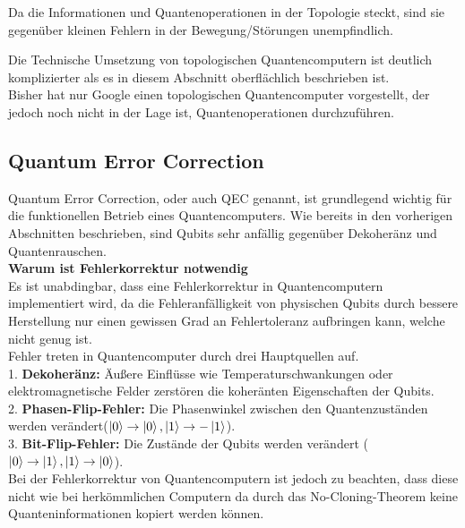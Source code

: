 Da die Informationen und Quantenoperationen in der Topologie steckt, sind sie gegenüber kleinen Fehlern in der Bewegung/Störungen unempfindlich.\\

\begin{tcolorbox}[title=Kommentar,
    title filled=false,
    colback=cyan!5!white,
    colframe=cyan!75!black]
    Die Technische Umsetzung von topologischen Quantencomputern ist deutlich komplizierter als es in diesem Abschnitt oberflächlich beschrieben ist.\\
    Bisher hat nur Google einen topologischen Quantencomputer vorgestellt, der jedoch noch nicht in der Lage ist, Quantenoperationen durchzuführen.
\end{tcolorbox}

\subsection{Quantum Error Correction}
\label{sub:quantum_error_correction}
Quantum Error Correction, oder auch QEC genannt, ist grundlegend wichtig für die funktionellen Betrieb eines Quantencomputers. Wie bereits in den vorherigen Abschnitten beschrieben,
sind Qubits sehr anfällig gegenüber Dekoheränz und Quantenrauschen.\\

\textbf{Warum ist Fehlerkorrektur notwendig}\\
Es ist unabdingbar, dass eine Fehlerkorrektur in Quantencomputern implementiert wird, da die Fehleranfälligkeit von physischen Qubits durch bessere Herstellung nur einen gewissen Grad an Fehlertoleranz aufbringen kann, welche nicht genug ist.\\

Fehler treten in Quantencomputer durch drei Hauptquellen auf.\\
1. \textbf{Dekoheränz:} Äußere Einflüsse wie Temperaturschwankungen oder elektromagnetische Felder zerstören die koheränten Eigenschaften der Qubits.\\
2. \textbf{Phasen-Flip-Fehler:} Die Phasenwinkel zwischen den Quantenzuständen werden verändert($\ket{0}\rightarrow\ket{0},\ket{1}\rightarrow-\ket{1}$).\\ 
3. \textbf{Bit-Flip-Fehler:} Die Zustände der Qubits werden verändert ($\ket{0}\rightarrow\ket{1},\ket{1}\rightarrow\ket{0}$).\\

Bei der Fehlerkorrektur von Quantencomputern ist jedoch zu beachten, dass diese nicht wie bei herkömmlichen Computern da durch das No-Cloning-Theorem keine Quanteninformationen kopiert werden können.\\


